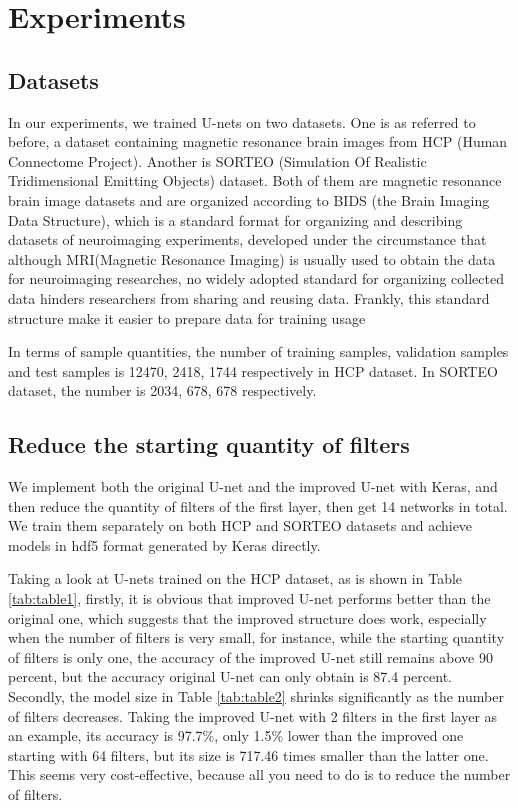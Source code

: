 \documentclass[sigconf]{acmart}
\begin{document}
\section{Experiments}
\subsection{Datasets}
In our experiments, we trained U-nets on two datasets. One is as referred to before, a dataset containing magnetic resonance brain images from HCP (Human Connectome Project)\cite{hcp}. Another is SORTEO (Simulation Of Realistic Tridimensional Emitting Objects) dataset\cite{sorteo}. Both of them are magnetic resonance brain image datasets and are organized according to BIDS (the Brain Imaging Data Structure), which is a standard format for organizing and describing datasets of neuroimaging experiments, developed under the circumstance that although MRI(Magnetic Resonance Imaging) is usually used to obtain the data for neuroimaging researches, no widely adopted standard for organizing collected data hinders researchers from sharing and reusing data\cite{bids}. Frankly, this standard structure make it easier to prepare data for training usage

In terms of sample quantities, the number of training samples, validation samples and test samples is 12470, 2418, 1744 respectively in HCP dataset. In SORTEO dataset, the number is 2034, 678, 678 respectively.

\subsection{Reduce the starting quantity of filters}
We implement both the original U-net and the improved U-net with Keras, and then reduce the quantity of filters of the first layer, then get 14 networks in total. We train them separately on both HCP and SORTEO datasets and achieve models in hdf5 format generated by Keras directly.

Taking a look at U-nets trained on the HCP dataset, as is shown in Table \ref{tab:table1}, firstly, it is obvious that improved U-net performs better than the original one, which suggests that the improved structure does work, especially when the number of filters is very small, for instance, while the starting quantity of filters is only one, the accuracy of the improved U-net still remains above 90 percent, but the accuracy original U-net can only obtain is 87.4 percent. Secondly, the model size in Table \ref{tab:table2} shrinks significantly as the number of filters decreases. Taking the improved U-net with 2 filters in the first layer as an example, its accuracy is 97.7\%, only 1.5\% lower than the improved one starting with 64 filters, but its size is 717.46 times smaller than the latter one. This seems very cost-effective, because all you need to do is to reduce the number of filters.
\end{document}
